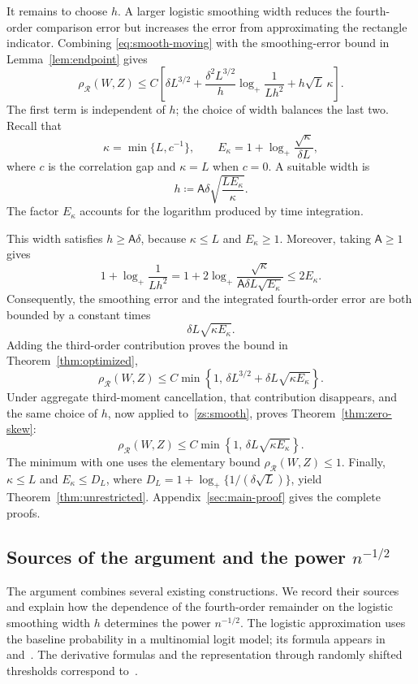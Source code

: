 \documentclass[11pt,letterpaper]{article}
\theoremstyle{remark}
\newcommand{\rh}{\rho_{\mathcal R}}
\begin{document}
It remains to choose \(h\). A larger logistic smoothing width reduces
the fourth-order comparison error but increases the error from
approximating the rectangle indicator. Combining
\eqref{eq:smooth-moving} with the smoothing-error bound in
Lemma~\ref{lem:endpoint} gives
\[
 \rh(W,Z)\le C\left[
 \delta L^{3/2}
 +\frac{\delta^2L^{3/2}}h\log_+\frac1{Lh^2}
 +h\sqrt L\,\kappa\right].
\]
The first term is independent of \(h\); the choice of width balances
the last two. Recall that
\[
 \kappa=\min\{L,c^{-1}\},
 \qquad E_\kappa=1+\log_+\frac{\sqrt\kappa}{\delta L},
\]
where \(c\) is the correlation gap and \(\kappa=L\) when \(c=0\).
A suitable width is
\begin{equation}
 h\coloneqq\mathsf A\delta\sqrt{\frac{LE_\kappa}{\kappa}}.
 \label{eq:optimal-scale}
\end{equation}
The factor \(E_\kappa\) accounts for the logarithm produced by time
integration.

This width satisfies \(h\ge\mathsf A\delta\), because
\(\kappa\le L\) and \(E_\kappa\ge1\). Moreover, taking
\(\mathsf A\ge1\) gives
\[
 1+\log_+\frac1{Lh^2}
 =1+2\log_+\frac{\sqrt\kappa}
     {\mathsf A\delta L\sqrt{E_\kappa}}
 \le2E_\kappa.
\]
Consequently, the smoothing error and the integrated fourth-order
error are both bounded by a constant times
\[
 \delta L\sqrt{\kappa E_\kappa}.
\]
Adding the third-order contribution proves the bound in
Theorem~\ref{thm:optimized},
\[
 \rh(W,Z)\le C\min\!\left\{1,\,
 \delta L^{3/2}+\delta L\sqrt{\kappa E_\kappa}\right\}.
\]
Under aggregate third-moment cancellation, that contribution
disappears, and the same choice of \(h\), now applied
to~\eqref{zs:smooth}, proves Theorem~\ref{thm:zero-skew}:
\[
 \rh(W,Z)\le C\min\!\left\{1,\,
 \delta L\sqrt{\kappa E_\kappa}\right\}.
\]
The minimum with one uses the elementary bound \(\rh(W,Z)\le1\).
Finally, \(\kappa\le L\) and \(E_\kappa\le D_L\), where
\(D_L=1+\log_+\{1/(\delta\sqrt L)\}\), yield
Theorem~\ref{thm:unrestricted}. Appendix~\ref{sec:main-proof}
gives the complete proofs.


\subsection{\texorpdfstring{Sources of the argument and the power \(n^{-1/2}\)}{Sources of the argument and the power n to the -1/2}}
\label{sec:why-rate}\label{sec:sources}

The argument combines several existing constructions. We record
their sources and explain how the dependence of the fourth-order
remainder on the logistic smoothing width \(h\) determines the power
\(n^{-1/2}\). The logistic approximation uses the baseline probability
in a multinomial logit model; its formula appears
in~\cite[p.~1001]{McFadden1989} and~\cite[equation~(5)]{GaoZhang}.
The derivative formulas and the representation through randomly
shifted thresholds correspond to~\cite[Lemmas~13 and~14]{GaoZhang}.
\end{document}
